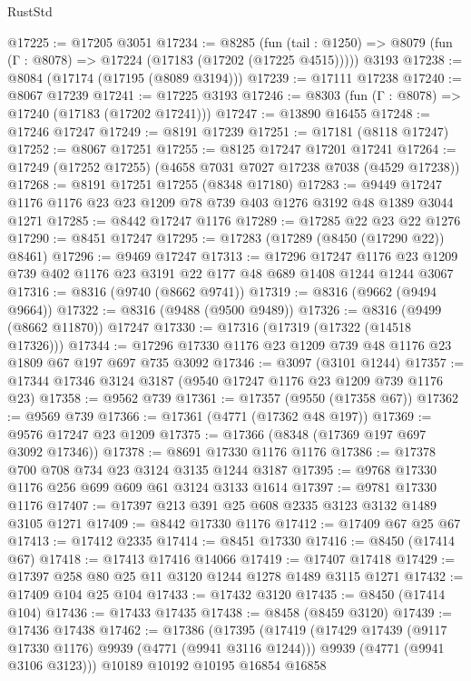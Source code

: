 \begin{lexlean}{RustStd}
\begin{coremodule}
@17225 := @17205 @3051
@17234 := @8285
    (fun (tail : @1250) => @8079 (fun (Γ : @8078) => @17224 (@17183 (@17202 (@17225 @4515)))))
    @3193
@17238 := @8084 (@17174 (@17195 (@8089 @3194)))
@17239 := @17111 @17238
@17240 := @8067 @17239
@17241 := @17225 @3193
@17246 := @8303 (fun (Γ : @8078) => @17240 (@17183 (@17202 @17241)))
@17247 := @13890 @16455
@17248 := @17246 @17247
@17249 := @8191 @17239
@17251 := @17181 (@8118 @17247)
@17252 := @8067 @17251
@17255 := @8125 @17247 @17201 @17241
@17264 := @17249 (@17252 @17255) (@4658 @7031 @7027 @17238 @7038 (@4529 @17238))
@17268 := @8191 @17251 @17255 (@8348 @17180)
@17283 := @9449 @17247 @1176 @1176 @23 @23 @1209 @78 @739 @403 @1276 @3192 @48 @1389 @3044 @1271
@17285 := @8442 @17247 @1176
@17289 := @17285 @22 @23 @22 @1276
@17290 := @8451 @17247
@17295 := @17283 (@17289 (@8450 (@17290 @22)) @8461)
@17296 := @9469 @17247
@17313 := @17296
    @17247
    @1176
    @23
    @1209
    @739
    @402
    @1176
    @23
    @3191
    @22
    @177
    @48
    @689
    @1408
    @1244
    @1244
    @3067
@17316 := @8316 (@9740 (@8662 @9741))
@17319 := @8316 (@9662 (@9494 @9664))
@17322 := @8316 (@9488 (@9500 @9489))
@17326 := @8316 (@9499 (@8662 @11870)) @17247
@17330 := @17316 (@17319 (@17322 (@14518 @17326)))
@17344 := @17296 @17330 @1176 @23 @1209 @739 @48 @1176 @23 @1809 @67 @197 @697 @735 @3092
@17346 := @3097 (@3101 @1244)
@17357 := @17344 @17346 @3124 @3187 (@9540 @17247 @1176 @23 @1209 @739 @1176 @23)
@17358 := @9562 @739
@17361 := @17357 (@9550 (@17358 @67))
@17362 := @9569 @739
@17366 := @17361 (@4771 (@17362 @48 @197))
@17369 := @9576 @17247 @23 @1209
@17375 := @17366 (@8348 (@17369 @197 @697 @3092 @17346))
@17378 := @8691 @17330 @1176 @1176
@17386 := @17378 @700 @708 @734 @23 @3124 @3135 @1244 @3187
@17395 := @9768 @17330 @1176 @256 @699 @609 @61 @3124 @3133 @1614
@17397 := @9781 @17330 @1176
@17407 := @17397 @213 @391 @25 @608 @2335 @3123 @3132 @1489 @3105 @1271
@17409 := @8442 @17330 @1176
@17412 := @17409 @67 @25 @67
@17413 := @17412 @2335
@17414 := @8451 @17330
@17416 := @8450 (@17414 @67)
@17418 := @17413 @17416 @14066
@17419 := @17407 @17418
@17429 := @17397 @258 @80 @25 @11 @3120 @1244 @1278 @1489 @3115 @1271
@17432 := @17409 @104 @25 @104
@17433 := @17432 @3120
@17435 := @8450 (@17414 @104)
@17436 := @17433 @17435
@17438 := @8458 (@8459 @3120)
@17439 := @17436 @17438
@17462 := @17386
    (@17395
      (@17419
        (@17429 @17439 (@9117 @17330 @1176) @9939 (@4771 (@9941 @3116 @1244)))
        @9939
        (@4771 (@9941 @3106 @3123)))
      @10189
      @10192
      @10195
      @16854
      @16858

\end{coremodule}
\end{lexlean}
